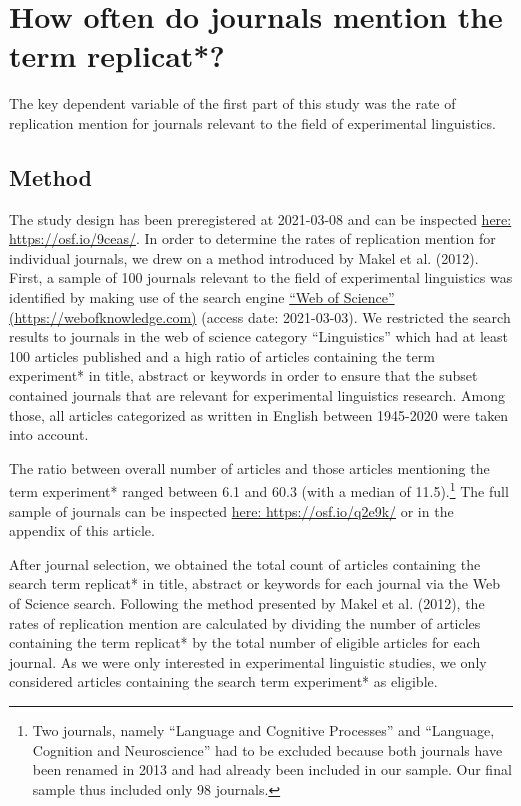 \documentclass[]{elsarticle} %
\begin{document}
\hypertarget{how-often-do-journals-mention-the-term-replicat}{%
\section{How often do journals mention the term replicat*?}\label{how-often-do-journals-mention-the-term-replicat}}

The key dependent variable of the first part of this study was the rate of replication mention for journals relevant to the field of experimental linguistics.

\hypertarget{method}{%
\subsection{Method}\label{method}}

The study design has been preregistered at 2021-03-08 and can be inspected \href{https://osf.io/9ceas/}{here: https://osf.io/9ceas/}.
In order to determine the rates of replication mention for individual journals, we drew on a method introduced by Makel et al. (2012).
First, a sample of 100 journals relevant to the field of experimental linguistics was identified by making use of the search engine \href{https://webofknowledge.com}{``Web of Science'' (https://webofknowledge.com)} (access date: 2021-03-03). We restricted the search results to journals in the web of science category ``Linguistics'' which had at least 100 articles published and a high ratio of articles containing the term experiment* in title, abstract or keywords in order to ensure that the subset contained journals that are relevant for experimental linguistics research. Among those, all articles categorized as written in English between 1945-2020 were taken into account.

The ratio between overall number of articles and those articles mentioning the term experiment* ranged between 6.1 and 60.3 (with a median of 11.5).\footnote{Two journals, namely ``Language and Cognitive Processes'' and ``Language, Cognition and Neuroscience'' had to be excluded because both journals have been renamed in 2013 and had already been included in our sample. Our final sample thus included only 98 journals.}
The full sample of journals can be inspected \href{https://osf.io/q2e9k/}{here: https://osf.io/q2e9k/} or in the appendix of this article.

After journal selection, we obtained the total count of articles containing the search term replicat* in title, abstract or keywords for each journal via the Web of Science search.
Following the method presented by Makel et al. (2012), the rates of replication mention are calculated by dividing the number of articles containing the term replicat* by the total number of eligible articles for each journal. As we were only interested in experimental linguistic studies, we only considered articles containing the search term experiment* as eligible.
\end{document}
